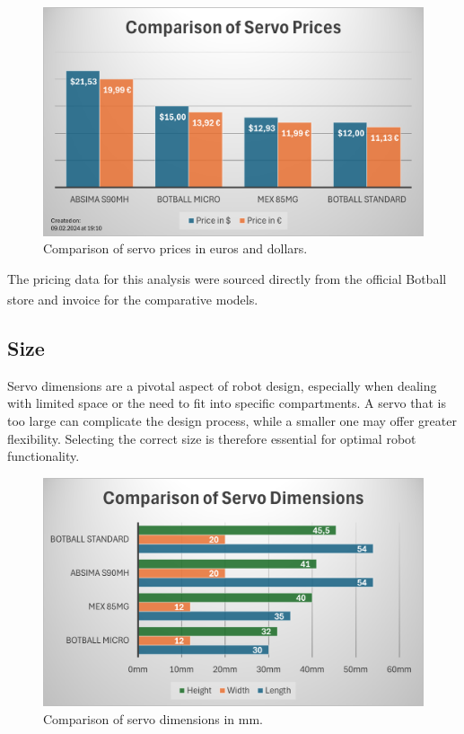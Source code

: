 \documentclass[conference]{IEEEtran}
\begin{document}
\begin{figure}[hbpt]
\centering
\includegraphics[width=\linewidth]{price_comparison_chart.png}
\caption{Comparison of servo prices in euros and dollars.}
\label{fig:price_comparison}
\end{figure}

The pricing data for this analysis were sourced directly from the official Botball store\textsuperscript{\cite{b3, b4}} and invoice for the comparative models.

\subsection{Size}
Servo dimensions are a pivotal aspect of robot design, especially when dealing with limited space or the need to fit into specific compartments. A servo that is too large can complicate the design process, while a smaller one may offer greater flexibility. Selecting the correct size is therefore essential for optimal robot functionality.

\begin{figure}[hbpt]
\centering
\includegraphics[width=\linewidth]{dimension_comparison_chart.png}
\caption{Comparison of servo dimensions in mm.}
\label{fig:dimension_comparison}
\end{figure}
\end{document}
